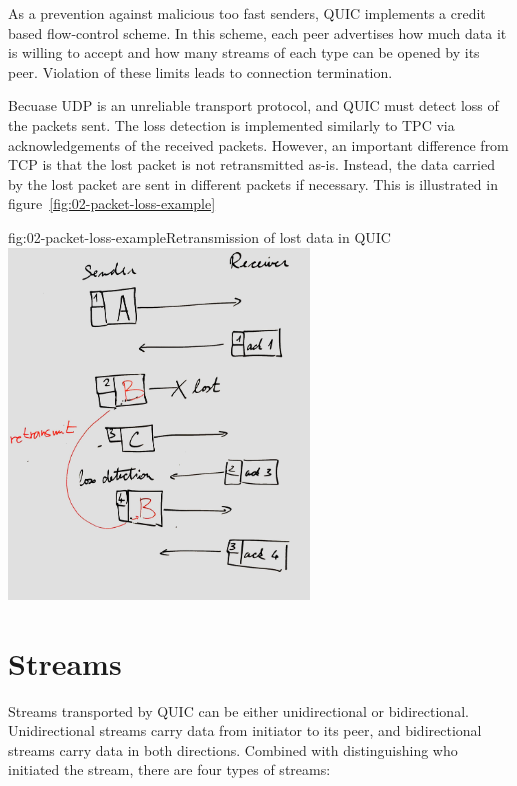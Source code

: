 As a prevention against malicious too fast senders, QUIC implements a credit based flow-control
scheme. In this scheme, each peer advertises how much data it is willing to accept and how many
streams of each type can be opened by its peer. Violation of these limits leads to connection
termination.

Becuase UDP is an unreliable transport protocol, and QUIC must detect loss of the packets sent. The
loss detection is implemented similarly to TPC via acknowledgements of the received packets.
However, an important difference from TCP is that the lost packet is not retransmitted as-is.
Instead, the data carried by the lost packet are sent in different packets if necessary. This is
illustrated in figure~\ref{fig:02-packet-loss-example}

\begin{myFigure}{fig:02-packet-loss-example}{Retransmission of lost data in QUIC}
  \includegraphics[width=0.6\textwidth]{img/02-retransmission-example}
\end{myFigure}

\section{Streams}

Streams transported by QUIC can be either unidirectional or bidirectional. Unidirectional streams
carry data from initiator to its peer, and bidirectional streams carry data in both directions.
Combined with distinguishing who initiated the stream, there are four types of streams:


